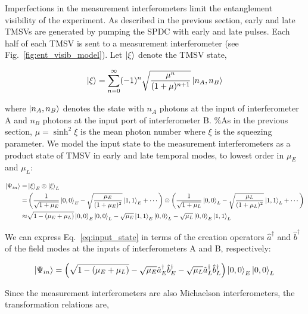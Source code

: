 \documentclass[11pt]{caltech_thesis} %
\begin{document}
Imperfections in the measurement interferometers limit the entanglement visibility of the experiment. As described in the previous section, early and late TMSVs are generated by pumping the SPDC with early and late pulses. Each half of each TMSV is sent to a measurement interferometer (see Fig.~\ref{fig:ent_visib_model}). Let $\ket{\xi}$ denote the TMSV state,

\begin{align}
    \ket{\xi} = \sum_{n=0}^{\infty}(-1)^n \sqrt{\frac{\mu^n}{(1+\mu)^{n+1}}}\ket{n_A,n_B}
\end{align}

where $\ket{n_A,n_B}$ denotes the state with $n_A$ photons at the input of interferometer A and $n_B$ photons at the input port of interferometer B. \%As in the previous section, $\mu = \sinh^2{\xi}$ is the mean photon number where $\xi$ is the squeezing parameter.
We model the input state to the measurement interferometers as a product state of TMSV in early and late temporal modes, to lowest order in $\mu_E$ and $\mu_L$:

\hypertarget{eq:input_state}{}{
\begin{align}
    \ket{\Psi_{in}} =& \ket{\xi}_E\otimes \ket{\xi}_L \nonumber \\
    = &\left(\frac{1}{\sqrt{1+\mu_E}}\ket{0,0}_E -\sqrt{\frac{\mu_E}{(1+\mu_E)^2}}\ket{1,1}_E +\cdots\right)
    \otimes \left(\frac{1}{\sqrt{1+\mu_L}}\ket{0,0}_L -\sqrt{\frac{\mu_L}{(1+\mu_L)^2}}\ket{1,1}_L +\cdots\right)\nonumber\\
    \approx& \sqrt{1-(\mu_E +\mu_L)}\ket{0,0}_E \ket{0,0}_L -\sqrt{\mu_E}\ket{1,1}_E  \ket{0,0}_L  -\sqrt{\mu_L}\ket{0,0}_E  \ket{1,1}_L\label{eq:input_state}
\end{align}
}

We can express Eq.~\ref{eq:input_state} in terms of the creation operators $\hat{a}^\dagger$ and $\hat{b}^\dagger$ of the field modes at the inputs of interferometers A and B, respectively:

\hypertarget{eq:input_state_fields}{}{
\begin{align}
    \ket{\Psi_{in}} =\Big(\sqrt{1-(\mu_E+\mu_L)}-\sqrt{\mu_E} \hat{a}_{E}^{\dagger}\hat{b}_{E}^{\dagger} - \sqrt{\mu_L} \hat{a}_{L}^{\dagger}\hat{b}_{L}^{\dagger} \Big)\ket{0,0}_E\ket{0,0}_L \label{eq:input_state_fields}
\end{align}
}

Since the measurement interferometers are also Michaelson interferometers, the transformation relations are,
\end{document}
